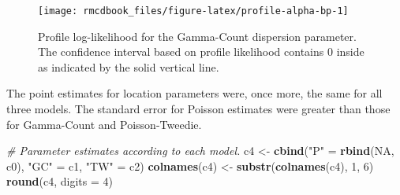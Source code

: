 \documentclass[9pt,a5paper,]{book}
\newenvironment{Shaded}{}{}
\newcommand{\KeywordTok}[1]{\textbf{{#1}}}
\newcommand{\DataTypeTok}[1]{\underline{{#1}}}
\newcommand{\DecValTok}[1]{{#1}}
\newcommand{\StringTok}[1]{{#1}}
\newcommand{\CommentTok}[1]{\textit{{#1}}}
\newcommand{\OtherTok}[1]{{#1}}
\newcommand{\NormalTok}[1]{{#1}}
\renewenvironment{Shaded}{\color{inputcolor}}{}
\renewcommand{\DataTypeTok}[1]{{#1}}
\theoremstyle{definition}
\theoremstyle{definition}
\theoremstyle{remark}
\begin{document}
\begin{figure}[h]

{\centering \texttt{[image: rmcdbook\_files/figure-latex/profile-alpha-bp-1]} 

}

\caption{Profile log-likelihood for the Gamma-Count dispersion parameter. The confidence interval based on profile likelihood contains 0 inside as indicated by the solid vertical line.}\label{fig:profile-alpha-bp}
\end{figure}

The point estimates for location parameters were, once more, the same
for all three models. The standard error for Poisson estimates were
greater than those for Gamma-Count and Poisson-Tweedie.

\begin{Shaded}
\end{Shaded}

\begin{Shaded}
\begin{Highlighting}[]
\CommentTok{# Parameter estimates according to each model.}
\NormalTok{c4 <-}\StringTok{ }\KeywordTok{cbind}\NormalTok{(}\StringTok{"P"} \NormalTok{=}\StringTok{ }\KeywordTok{rbind}\NormalTok{(}\OtherTok{NA}\NormalTok{, c0),}
            \StringTok{"GC"} \NormalTok{=}\StringTok{ }\NormalTok{c1,}
            \StringTok{"TW"} \NormalTok{=}\StringTok{ }\NormalTok{c2)}
\KeywordTok{colnames}\NormalTok{(c4) <-}\StringTok{ }\KeywordTok{substr}\NormalTok{(}\KeywordTok{colnames}\NormalTok{(c4), }\DecValTok{1}\NormalTok{, }\DecValTok{6}\NormalTok{)}
\KeywordTok{round}\NormalTok{(c4, }\DataTypeTok{digits =} \DecValTok{4}\NormalTok{)}
\end{Highlighting}
\end{Shaded}
\end{document}
